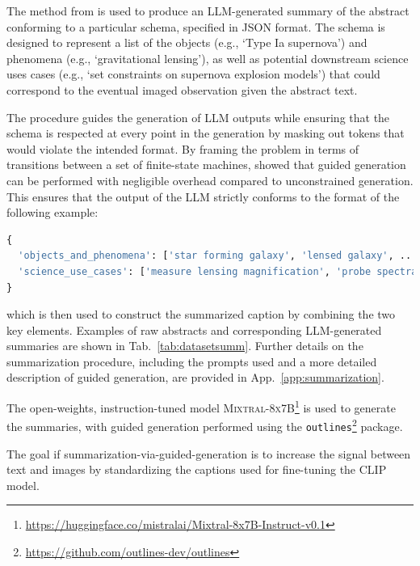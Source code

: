 \documentclass[10pt]{article} %
\newcommand{\datafolder}[1]{\def\thedatafolder{#1}}
\begin{document}
The method from \cite{willard2023efficient} is used to produce an LLM-generated summary of the abstract conforming to a particular schema, specified in JSON format. The schema is designed to represent a list of the objects (e.g., `Type Ia supernova') and phenomena (e.g., `gravitational lensing'), as well as potential downstream science uses cases (e.g., `set constraints on supernova explosion models') that could correspond to the eventual imaged observation given the abstract text.

The procedure guides the generation of LLM outputs while ensuring that the schema is respected at every point in the generation by masking out tokens that would violate the intended format. By framing the problem in terms of transitions between a set of finite-state machines, \cite{willard2023efficient} showed that guided generation can be performed with negligible overhead compared to unconstrained generation. This ensures that the output of the LLM strictly conforms to the format of the following example:
\begin{lstlisting}[language=Python]
{
  'objects_and_phenomena': ['star forming galaxy', 'lensed galaxy', ...], 
  'science_use_cases': ['measure lensing magnification', 'probe spectral energy distributions', ...]
}
\end{lstlisting}
which is then used to construct the summarized caption by combining the two key elements. Examples of raw abstracts and corresponding LLM-generated summaries are shown in Tab.~\ref{tab:datasetsumm}. Further details on the summarization procedure, including the prompts used and a more detailed description of guided generation, are provided in App.~\ref{app:summarization}.

The open-weights, instruction-tuned model \textsc{Mixtral-8x7B}\footnote{\url{https://huggingface.co/mistralai/Mixtral-8x7B-Instruct-v0.1}} is used to generate the summaries, with guided generation performed using the \texttt{outlines}\footnote{\url{https://github.com/outlines-dev/outlines}} package.

The goal if summarization-via-guided-generation is to increase the signal between text and images by standardizing the captions used for fine-tuning the CLIP model. 


\datafolder{./plots/data/}
 
\end{document}
